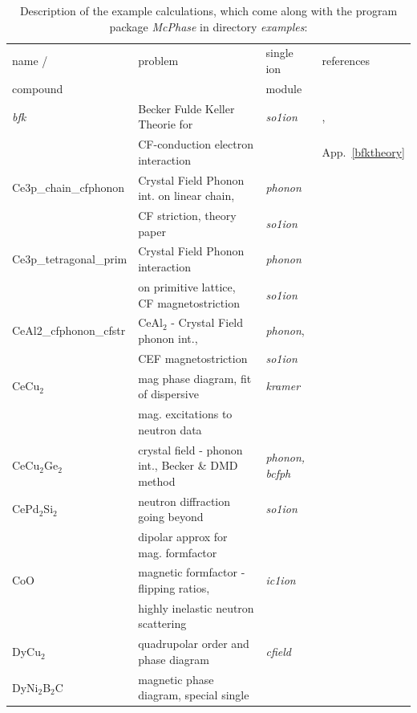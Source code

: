 \documentclass[twoside]{article}
\newcommand{\prg}{\sl}
\begin{document}
\begin{table}[thb] 
\begin{center}  
\caption {Description of the example calculations, which come along with the program package {\prg McPhase} in directory {\prg %
examples}:}   
\label{examples}   
\begin{tabular} 
{l|l|l|l}
name /       & problem & single ion & references \\ 
compound     &          & module  &             \\
\hline
{\prg bfk }    & Becker Fulde Keller Theorie for & {\prg so1ion }\index{bfk} &  \cite{becker77-9}, \\
               &  CF-conduction electron interaction & &  App.~\ref{bfktheory}\\
Ce3p\_chain\_cfphonon & Crystal Field Phonon int. on linear chain, & {\prg phonon } & \\
                      &   CF striction, theory paper & {\prg so1ion } & \\
Ce3p\_tetragonal\_prim & Crystal Field Phonon interaction & {\prg phonon} &  \\
                     &  on primitive lattice, CF magnetostriction & {\prg so1ion } & \\
CeAl2\_cfphonon\_cfstr &  CeAl$_2$ - Crystal Field phonon int., & {\prg phonon}, &  \\
                       &   CEF magnetostriction &   {\prg so1ion } &  \\
CeCu$_2$       & mag phase diagram, fit of dispersive  & {\prg kramer}\index{kramer} & \cite{loewenhaupt06-775,schedler03-1313} \\
               & mag. excitations to neutron data      &               & \\
CeCu$_2$Ge$_2$ & crystal field - phonon int., Becker \& DMD method & {\prg phonon, bcfph }  & \\
CePd$_2$Si$_2$ & neutron diffraction going beyond  & {\prg %
so1ion}&\cite{rotter09-140405} \\
               & dipolar approx for mag. formfactor & &\\     
CoO            & magnetic formfactor - flipping ratios,   &{\prg  ic1ion} & \\
               & highly inelastic neutron scattering      &               & \\
DyCu$_2$       & quadrupolar order and phase diagram & {\prg cfield}\index{cfield}&\cite{yoshida98-1421} \\
DyNi$_2$B$_2$C & magnetic phase diagram, special single  & {\prg %
}
\end{tabular}
\end{center}
\end{table}
\end{document}
